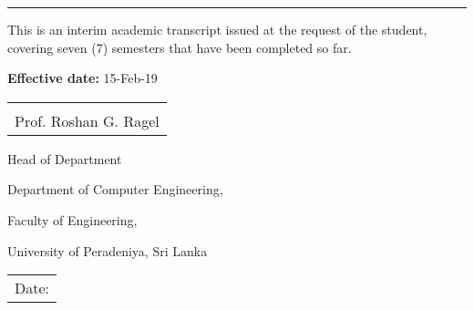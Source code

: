 \documentclass[12pt]{article}
\makeatletter
\newcommand{\sign}[1]{%
  \begin{tabular}[t]{@{}l@{}}
  \makebox[2.5in]{\dotfill}\\
  \strut#1\strut
  \end{tabular}%
}
\newcommand{\Date}{%
  \begin{tabular}[t]{@{}p{2.5in}@{}}
  \\[-2ex]
  \strut Date: \dotfill\strut
  \end{tabular}%
}
\makeatother
\begin{document}
%
%
%  


\noindent\rule{\textwidth}{1pt}
\vspace{5pt}
This is an interim academic transcript issued at the request of the student, covering seven (7) semesters that have been completed so far.
\vspace{5pt}

\noindent\textbf{Effective date:} 15-Feb-19

\vspace{45pt}

\noindent
\begin{minipage}[t]{0.5\linewidth}
    \raggedright
    \sign{Prof. Roshan G. Ragel}
    \par
    Head of Department\par
    Department of Computer Engineering, \par
    Faculty of Engineering, \par
    University of Peradeniya, Sri Lanka
\end{minipage}%
\hfill
  \begin{minipage}[t]{0.4\linewidth}
    \Date
  \end{minipage}
\end{document}
